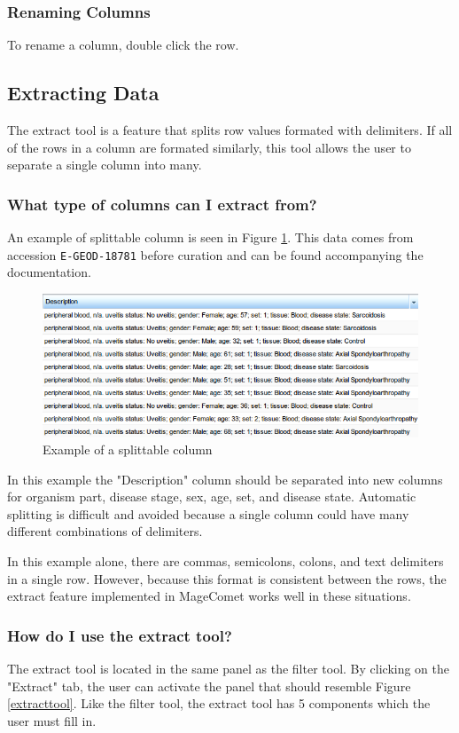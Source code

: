 \documentclass[a4paper]{article}
\begin{document}
\subsubsection{Renaming Columns}
To rename a column, double click the row.
\subsection{Extracting Data}
The extract tool is a feature that splits row values formated with delimiters. If all of the rows in a column are formated similarly, this tool allows the user to separate a single column into many.
\subsubsection{What type of columns can I extract from?}
An example of splittable column is seen in Figure \ref{splittable}. This data comes from accession  
\texttt{E-GEOD-18781} before curation and can be found accompanying the documentation.

\begin{figure}[h]
\caption{Example of a splittable column}
\centering
\label{splittable}
\includegraphics[width=15cm]{images/splittable}
\end{figure}

In this example the "Description" column should be separated into new columns for organism part, disease stage, sex, age, set, and disease state. Automatic splitting is difficult and avoided because a single column could have many different combinations of delimiters. 

In this example alone, there are commas, semicolons, colons, and text delimiters in a single row. However, because this format is consistent between the rows, the extract feature implemented in MageComet works well in these situations.

\subsubsection{How do I use the extract tool?}
The extract tool is located in the same panel as the filter tool. By clicking on the "Extract" tab, the user can activate the panel that should resemble Figure \ref{extracttool}. Like the filter tool, the extract tool has 5 components which the user must fill in.
\end{document}
